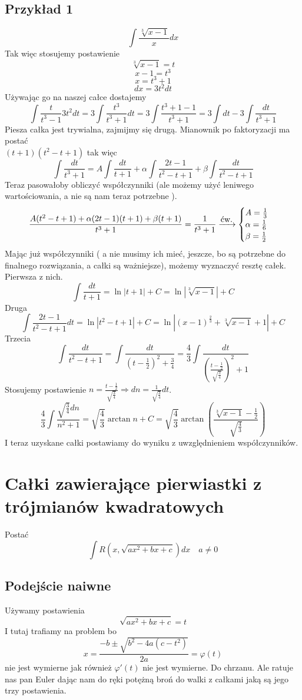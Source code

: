\documentclass[11pt]{article}
\begin{document}
\subsection{Przykład 1}
$$ \int \frac{\sqrt[3]{x-1}}{x}dx$$
Tak więc stosujemy postawienie $$ \sqrt[3]{x-1} = t$$
$$ x-1 = t^3 $$
$$ x = t^3 + 1$$
$$ dx = 3t^2dt$$
Używając go na naszej całce dostajemy
$$ \int \frac{t}{t^3-1} 3t^2dt = 3 \int \frac{t^3}{t^3+1}dt = 3\int \frac{t^3 + 1 -1}{t^3+1} = 3\int dt - 3\int  \frac{dt}{t^3+1}$$
Piesza całka jest trywialna, zajmijmy się drugą. Mianownik po faktoryzacji ma postać \\ $(t+1)(t^2-t+1)$ tak więc
$$ \int \frac{dt}{t^3+1} = A \int \frac{dt}{t+1} + \alpha \int \frac{2t -1}{t^2 -t +1} + \beta \int \frac{dt}{t^2-t+1} $$
Teraz pasowałoby obliczyć współczynniki (ale możemy użyć leniwego wartościowania, a nie są nam teraz potrzebne ). 
$$ \frac{A(t^2 -t +1) + \alpha (2t -1) (t+1) + \beta(t+1)}{t^3+1} =\frac{1}{t^3+1} \xrightarrow{\hbox{ćw.}} \begin{cases} A = \frac{1}{3} \\ \alpha = \frac{1}{6} \\ \beta = \frac{1}{2} \end{cases}$$
Mając już współczynniki ( a nie musimy ich mieć, jeszcze, bo są potrzebne do finalnego rozwiązania, a całki są ważniejsze), możemy wyznaczyć resztę całek. Pierwsza z nich.
$$ \int \frac{dt}{t+1} = \ln{|t+1|} + C = \ln{|\sqrt[3]{x-1}|} + C $$
Druga
$$ \int \frac{2t -1}{t^2 -t +1} dt = \ln{ |t^2 -t +1|} + C = \ln{| (x-1)^{\frac{2}{3}} + \sqrt[3]{x-1} + 1|} + C$$
\newpage
Trzecia
$$ \int \frac{dt}{t^2 - t + 1} = \int \frac{dt}{\left(t - \frac{1}{2}\right)^2 + \frac{3}{4}} = \frac{4}{3} \int \frac{dt}{\left(\frac{t-\frac{1}{2}}{\sqrt{\frac{3}{4}}}\right)^2 + 1}$$
Stosujemy postawienie $n = \frac{t-\frac{1}{2}}{\sqrt{\frac{3}{4}}} \Rightarrow dn = \frac{1}{\sqrt{\frac{3}{4}}} dt$.
$$ \frac{4}{3} \int \frac{\sqrt{\frac{3}{4}}dn}{n^2+1} = \sqrt{\frac{4}{3}} \arctan{n} + C = \sqrt{\frac{4}{3}} \arctan{\left(\frac{\sqrt[3]{x-1}-\frac{1}{2}}{\sqrt{\frac{4}{3}}}\right)} $$
I teraz uzyskane całki postawiamy do wyniku z uwzględnieniem współczynników.
\section{Całki zawierające pierwiastki z trójmianów kwadratowych}
Postać
$$ \int R(x,\sqrt{ax^2 + bx + c})dx  \quad a \not=0$$
\subsection{Podejście naiwne}
Używamy postawienia $$ \sqrt{ax^2 + bx + c} = t $$
I tutaj trafiamy na problem bo $$ x = \frac{-b \pm \sqrt{b^2 - 4a(c-t^2)}}{2a} = \varphi(t)$$ nie jest wymierne
jak również $\varphi'(t)$ nie jest wymierne. Do chrzanu.
Ale ratuje nas pan Euler dając nam do ręki potężną broń do walki z całkami jaką są jego trzy postawienia.
\end{document}
